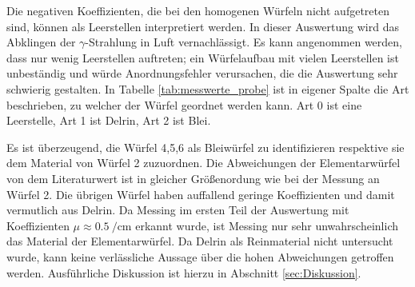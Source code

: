 Die negativen Koeffizienten, die bei den homogenen Würfeln nicht
aufgetreten sind, können als Leerstellen interpretiert werden.
In dieser Auswertung wird das Abklingen der $\gamma$-Strahlung in Luft vernachlässigt.
Es kann angenommen werden, dass nur wenig Leerstellen auftreten; ein Würfelaufbau
mit vielen Leerstellen ist unbeständig und würde Anordnungsfehler verursachen,
die die Auswertung sehr schwierig gestalten.
In Tabelle \ref{tab:messwerte_probe} ist in eigener Spalte die Art beschrieben,
zu welcher der Würfel geordnet werden kann. Art 0 ist eine Leerstelle, Art 1 ist Delrin,
Art 2 ist Blei.

Es ist überzeugend, die Würfel 4,5,6 als Bleiwürfel zu identifizieren respektive sie
dem Material von Würfel 2 zuzuordnen.
Die Abweichungen der Elementarwürfel von dem Literaturwert ist in gleicher Größenordung
wie bei der Messung an Würfel 2.
Die übrigen Würfel haben auffallend geringe Koeffizienten und damit vermutlich aus Delrin.
Da Messing im ersten Teil der Auswertung mit Koeffizienten $\mu\approx\SI{0.5}{\per\centi\meter}$
erkannt wurde, ist Messing nur sehr unwahrscheinlich das Material der Elementarwürfel.
Da Delrin als Reinmaterial nicht untersucht wurde, kann keine verlässliche Aussage über die
hohen Abweichungen getroffen werden.
Ausführliche Diskussion ist hierzu in Abschnitt \ref{sec:Diskussion}.
